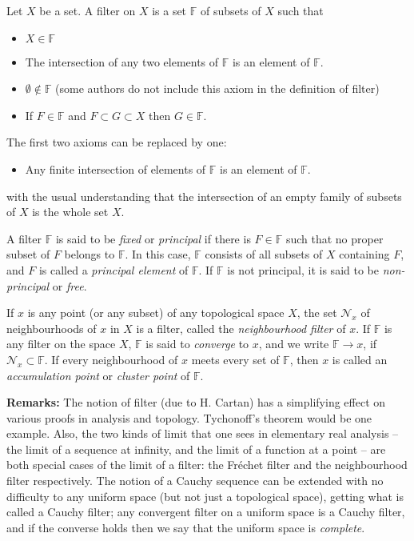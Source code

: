 \documentclass{article}
\begin{document}
\newcommand{\F}{\mathbb{F}}
Let $X$ be a set. A filter on $X$ is a set $\F$ of subsets of $X$
such that

\begin{itemize}
\item $X\in\F$
\item The intersection of any two elements of $\F$ is an element of $\F$.
\item $\emptyset\notin\F$ (some authors do not include this axiom in the definition of filter)
\item If $F\in\F$ and $F\subset G\subset X$ then $G\in\F$.
\end{itemize}
The first two axioms can be replaced by one:
\begin{itemize}
\item
Any finite intersection of elements of $\F$ is an element of $\F$.
\end{itemize}
with the usual understanding that the intersection of an empty family
of subsets of $X$ is the whole set $X$.

A filter $\F$ is said to be \emph{fixed}
or \emph{principal} if there is $F\in \F$ such that no proper subset of $F$ belongs to $\F$. In this case, $\F$ consists of all subsets of $X$ containing $F$, and $F$ is called a \emph{principal element} of $\F$. If $\F$ is not principal, it is said to be \emph{non-principal} or \emph{free}.

If $x$ is any point (or any subset) of any topological space $X$,
the set $\mathcal{N}_x$ of neighbourhoods of $x$ in $X$ is a filter,
called the \emph{neighbourhood filter} of $x$.
If $\F$ is any filter on the space $X$, $\F$
is said to \emph{converge} to $x$, and we write $\F\to x$,
if $\mathcal{N}_x\subset\F$.
If every neighbourhood of $x$ meets every set of $\F$, then
$x$ is called an \emph{accumulation point}
or \emph{cluster point} of $\F$.

\textbf{Remarks: }
The notion of filter (due to H. Cartan) has a simplifying effect on
various proofs in analysis and topology.
Tychonoff's theorem would be one example.
Also, the two kinds of limit that one sees in elementary real
analysis -- the limit of a sequence at infinity, and the limit
of a function at a point -- are both special cases of the limit
of a filter: the Fr\'echet filter and the neighbourhood filter
respectively.
The notion of a Cauchy sequence can be extended with no difficulty
to any uniform space (but not just a topological space),
getting what is called a Cauchy filter; any convergent filter on a
uniform space is a Cauchy filter, and if the converse holds then
we say that the uniform space is \emph{complete}.
\end{document}

